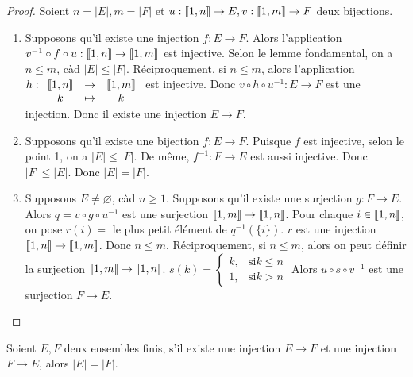 \begin{proof}
    Soient $n = |E|, m = |F|$ et $u: \llbracket 1, n \rrbracket \to E, v: \llbracket 1, m \rrbracket \to F$ deux bijections.
    \begin{enumerate}
        \item
              Supposons qu'il existe une injection $f: E \to F$.
              Alors l'application $v^{-1} \circ f \circ u: \llbracket 1, n \rrbracket \to \llbracket 1, m \rrbracket$ est injective.
              Selon le lemme fondamental, on a $n \leqslant m$, càd $|E| \leqslant |F|$.
              Réciproquement, si $n \leqslant m$, alors l'application $h:
                  \begin{array}[t]{ccc}
                      \llbracket 1, n \rrbracket & \to & \llbracket 1, m \rrbracket \\ k & \mapsto & k
                  \end{array}
              $ est injective.
              Donc $v \circ h \circ u^{-1}: E \to F$ est une injection.
              Donc il existe une injection $E \to F$.
        \item
              Supposons qu'il existe une bijection $f: E \to F$.
              Puisque $f$ est injective, selon le point 1, on a $|E| \leqslant |F|$.
              De même, $f^{-1}: F \to E$ est aussi injective.
              Donc $|F| \leqslant |E|$.
              Donc $|E| = |F|$.
        \item
              Supposons $E \neq \varnothing$, càd $n \geqslant 1$.
              Supposons qu'il existe une surjection $g: F \to E$.
              Alors $q = v \circ g \circ u^{-1}$ est une surjection $\llbracket 1, m \rrbracket \to \llbracket 1, n \rrbracket$.
              Pour chaque $i \in \llbracket 1, n \rrbracket$, on pose $r(i) =$ le plus petit élément de $q^{-1}(\{i\})$.
              $r$ est une injection $\llbracket 1, n \rrbracket \to \llbracket 1, m \rrbracket$.
              Donc $n \leqslant m$.
              Réciproquement, si $n \leqslant m$, alors on peut définir la surjection $\llbracket 1, m \rrbracket \to \llbracket 1, n \rrbracket$.
              $s(k) =
                  \begin{cases}
                      k, & \text{si} k \leqslant n \\ 1, & \text{si} k > n
                  \end{cases}
              $
              Alors $u \circ s \circ v^{-1}$ est une surjection $F \to E$.
    \end{enumerate}
\end{proof}

\begin{cor}
    Soient $E, F$ deux ensembles finis,
    s'il existe une injection $E \to F$ et une injection $F \to E$,
    alors $|E| = |F|$.
\end{cor}

